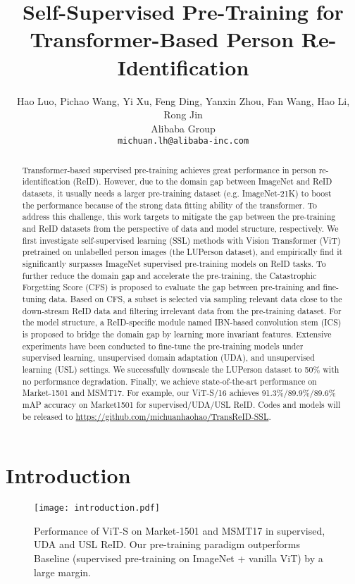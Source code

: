 \documentclass[10pt,twocolumn,letterpaper]{article}
\begin{document}
\title{Self-Supervised Pre-Training for Transformer-Based Person Re-Identification }
\newcommand*{\affaddr}[1]{#1}
\newcommand*{\affmark}[1][*]{\textsuperscript{#1}}
\author{Hao Luo, Pichao Wang, Yi Xu, Feng Ding, Yanxin Zhou, Fan Wang,  Hao Li, Rong Jin\\
\affaddr{\affmark[]Alibaba Group} \\
{\tt\small michuan.lh@alibaba-inc.com}
}
\maketitle

\begin{abstract}
Transformer-based supervised pre-training achieves great performance in person re-identification (ReID). However, due to the domain gap between ImageNet and ReID datasets, it usually needs a larger pre-training dataset (e.g. ImageNet-21K) to boost the performance because of the strong data fitting ability of the transformer. To address this challenge, this work targets to mitigate the gap between the pre-training and ReID datasets from the perspective of data and model structure, respectively. We first investigate self-supervised learning (SSL) methods with Vision Transformer (ViT) pretrained on unlabelled person images (the LUPerson dataset), and empirically find it significantly surpasses ImageNet supervised pre-training models on ReID tasks. To further reduce the domain gap and accelerate the pre-training, the Catastrophic Forgetting Score (CFS) is proposed to evaluate the gap between pre-training and fine-tuning data. Based on CFS, a subset is selected via sampling relevant data close to the down-stream ReID data and filtering irrelevant data from the pre-training dataset.  For the model structure, a ReID-specific module named IBN-based convolution stem (ICS) is proposed to bridge the domain gap by learning more invariant features. Extensive experiments have been conducted to fine-tune the pre-training models under supervised learning, unsupervised domain adaptation (UDA), and unsupervised learning (USL) settings. We successfully downscale the LUPerson dataset to 50\% with no performance degradation. Finally, we achieve state-of-the-art performance on Market-1501 and MSMT17. For example, our ViT-S/16 achieves 91.3\%/89.9\%/89.6\% mAP accuracy on Market1501 for supervised/UDA/USL ReID. Codes and models will be released to \url{https://github.com/michuanhaohao/TransReID-SSL}.
\end{abstract}
\section{Introduction}
\begin{figure}[htb]
    \centering
	\texttt{[image: introduction.pdf]}
	\caption{Performance of ViT-S on Market-1501 \cite{Market1501} and MSMT17 \cite{MSMT17} in supervised, UDA and USL ReID. Our pre-training paradigm outperforms Baseline (supervised pre-training on ImageNet + vanilla ViT) by a large margin.} 
    \vspace{-1em}
	\label{fig:intro}
\end{figure}
\end{document}
